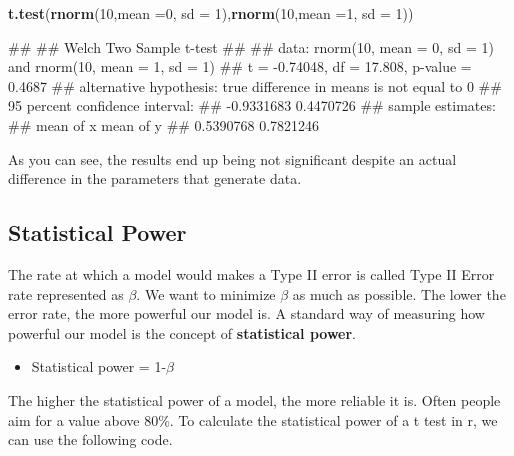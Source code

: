 \documentclass[
]{book}
\newenvironment{Shaded}{\begin{snugshade}}{\end{snugshade}}
\newcommand{\AttributeTok}[1]{\textcolor[rgb]{0.13,0.29,0.53}{#1}}
\newcommand{\DecValTok}[1]{\textcolor[rgb]{0.00,0.00,0.81}{#1}}
\newcommand{\FunctionTok}[1]{\textcolor[rgb]{0.13,0.29,0.53}{\textbf{#1}}}
\newcommand{\NormalTok}[1]{#1}
\providecommand{\tightlist}{%
  \setlength{\itemsep}{0pt}\setlength{\parskip}{0pt}}
\begin{document}
\begin{Shaded}
\begin{Highlighting}[]
\FunctionTok{t.test}\NormalTok{(}\FunctionTok{rnorm}\NormalTok{(}\DecValTok{10}\NormalTok{,}\AttributeTok{mean =}\DecValTok{0}\NormalTok{, }\AttributeTok{sd =} \DecValTok{1}\NormalTok{),}\FunctionTok{rnorm}\NormalTok{(}\DecValTok{10}\NormalTok{,}\AttributeTok{mean =}\DecValTok{1}\NormalTok{, }\AttributeTok{sd =} \DecValTok{1}\NormalTok{))}
\end{Highlighting}
\end{Shaded}

\begin{Shaded}
\begin{Highlighting}[]
\NormalTok{\#\# }
\NormalTok{\#\#  Welch Two Sample t{-}test}
\NormalTok{\#\# }
\NormalTok{\#\# data:  rnorm(10, mean = 0, sd = 1) and rnorm(10, mean = 1, sd = 1)}
\NormalTok{\#\# t = {-}0.74048, df = 17.808, p{-}value = 0.4687}
\NormalTok{\#\# alternative hypothesis: true difference in means is not equal to 0}
\NormalTok{\#\# 95 percent confidence interval:}
\NormalTok{\#\#  {-}0.9331683  0.4470726}
\NormalTok{\#\# sample estimates:}
\NormalTok{\#\# mean of x mean of y }
\NormalTok{\#\# 0.5390768 0.7821246}
\end{Highlighting}
\end{Shaded}

As you can see, the results end up being not significant despite an actual difference in the parameters that generate data.

\hypertarget{statistical-power}{%
\subsection{Statistical Power}\label{statistical-power}}

The rate at which a model would makes a Type II error is called Type II Error rate represented as \(\beta\). We want to minimize \(\beta\) as much as possible. The lower the error rate, the more powerful our model is. A standard way of measuring how powerful our model is the concept of \textbf{statistical power}.

\begin{itemize}
\tightlist
\item
  Statistical power = 1-\(\beta\)
\end{itemize}

The higher the statistical power of a model, the more reliable it is. Often people aim for a value above 80\%. To calculate the statistical power of a t test in r, we can use the following code.
\end{document}
